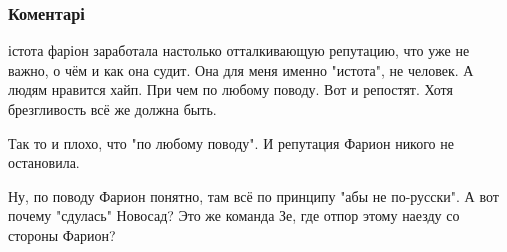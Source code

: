  
 
 
 
 
\subsubsection{Коментарі}
\label{sec:04_09_2019.fb.karevin_aleksandr.1.farion_novosad_mova.cmt}

\begin{itemize}
 

істота фаріон заработала настолько отталкивающую репутацию, что уже не важно, о
чём и как она судит. Она для меня именно "истота", не человек. А людям нравится
хайп. При чем по любому поводу. Вот и репостят. Хотя брезгливость всё же должна
быть.

\begin{itemize}
 
Так то и плохо, что "по любому поводу". И репутация Фарион никого не остановила.
\end{itemize}

 

Ну, по поводу Фарион понятно, там всё по принципу "абы не по-русски". А вот
почему "сдулась" Новосад? Это же команда Зе, где отпор этому наезду
со стороны Фарион?

\begin{itemize}
 

\end{itemize}
\end{itemize}
